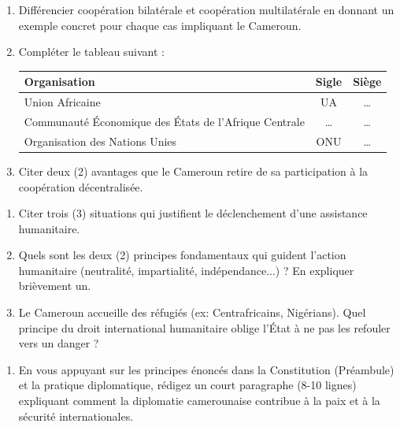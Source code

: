 \documentclass[11pt]{article}
\begin{document}
\begin{exercice}
\begin{enumerate}
    \item Différencier coopération bilatérale et coopération multilatérale en donnant un exemple concret pour chaque cas impliquant le Cameroun.
    \item Compléter le tableau suivant :
    \begin{center}
    \begin{tabular}{|l|c|c|}
    \hline
    \textbf{Organisation} & \textbf{Sigle} & \textbf{Siège} \\
    \hline
    Union Africaine & UA & \ldots \\
    \hline
    Communauté Économique des États de l'Afrique Centrale & \ldots & \ldots \\
    \hline
    Organisation des Nations Unies & ONU & \ldots \\
    \hline
    \end{tabular}
    \end{center}
    \item Citer deux (2) avantages que le Cameroun retire de sa participation à la coopération décentralisée.
\end{enumerate}
\end{exercice}

\begin{exercice}
\begin{enumerate}
    \item Citer trois (3) situations qui justifient le déclenchement d'une assistance humanitaire.
    \item Quels sont les deux (2) principes fondamentaux qui guident l'action humanitaire (neutralité, impartialité, indépendance...) ? En expliquer brièvement un.
    \item Le Cameroun accueille des réfugiés (ex: Centrafricains, Nigérians). Quel principe du droit international humanitaire oblige l'État à ne pas les refouler vers un danger ?
\end{enumerate}
\end{exercice}

\begin{exercice}
\begin{enumerate}
    \item En vous appuyant sur les principes énoncés dans la Constitution (Préambule) et la pratique diplomatique, rédigez un court paragraphe (8-10 lignes) expliquant comment la diplomatie camerounaise contribue à la paix et à la sécurité internationales.
\end{enumerate}
\end{exercice}
\end{document}
